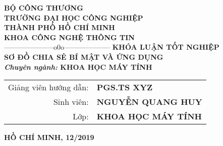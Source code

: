 \documentclass[12pt,a4paper]{report}
\begin{document}
\fontsize{13pt}{18pt}\selectfont
\setlength{\baselineskip}{18truept}

\begin{titlepage}
	\begin{center}
		{\large\bf BỘ CÔNG THƯƠNG}\\
		{\large\bf TRƯỜNG ĐẠI HỌC CÔNG NGHIỆP \\
			THÀNH PHỐ HỒ CHÍ MINH}\\
		{\large\bf KHOA CÔNG NGHỆ THÔNG TIN} \\
		{---------------------o0o--------------------}
		\vskip 4cm
		{\bf KHÓA LUẬN TỐT NGHIỆP}\\[1cm]
		{\Large\bf \textbf{SƠ ĐỒ CHIA SẺ BÍ MẬT VÀ ỨNG DỤNG}}\\
		\vskip 1cm
		{\bf {\it Chuyên ngành:} KHOA HỌC MÁY TÍNH}
		\vskip 5cm
		
		\begin{tabular}{r l}
		Giảng viên hướng dẫn:&{\bf PGS.TS XYZ}\\[0.5cm]
		Sinh viên:&{\bf NGUYỄN QUANG HUY}\\[0.5cm]
		Lớp:&{\bf KHOA HỌC MÁY TÍNH }
		\end{tabular}
	\vfill
	{\bf HỒ CHÍ MINH, 12/2019}
	\end{center}
\end{titlepage}
\end{document}
